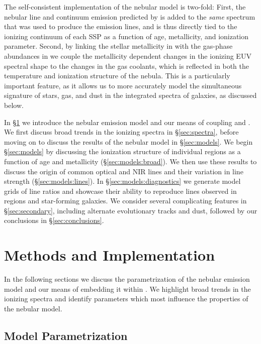 The self-consistent implementation of the nebular model is two-fold: First, the nebular line and continuum emission predicted by \Cloudy is added to the \emph{same} spectrum that was used to produce the emission lines, and is thus directly tied to the ionizing continuum of each SSP as a function of age, metallicity, and ionization parameter. Second, by linking the stellar metallicity in \FSPS with the gas-phase abundances in \Cloudy we couple the metallicity dependent changes in the ionizing EUV spectral shape to the changes in the gas coolants, which is reflected in both the temperature and ionization structure of the nebula. This is a particularly important feature, as it allows us to more accurately model the simultaneous signature of stars, gas, and dust in the integrated spectra of galaxies, as discussed below. 

In \S\ref{sec:methods} we introduce the nebular emission model and our means of coupling \FSPS and \Cloudy. We first discuss broad trends in the ionizing spectra in \S\ref{sec:spectra}, before moving on to discuss the results of the nebular model in \S\ref{sec:models}. We begin \S\ref{sec:models} by discussing the ionization structure of individual \hii regions as a function of age and metallicity (\S\ref{sec:models:broad}). We then use these results to discuss the origin of common optical and NIR lines and their variation in line strength (\S\ref{sec:models:lines}). In \S\ref{sec:models:diagnostics} we generate model grids of line ratios and showcase their ability to reproduce lines observed in \hii regions and star-forming galaxies. We consider several complicating features in \S\ref{sec:secondary}, including alternate evolutionary tracks and dust, followed by our conclusions in \S\ref{sec:conclusions}.

\section{Methods and Implementation}\label{sec:methods}

In the following sections we discuss the parametrization of the nebular emission model and our means of embedding it within \FSPS. We highlight broad trends in the ionizing spectra and identify parameters which most influence the properties of the nebular model.

\subsection{\Cloudy Model Parametrization}\label{sec:methods:cloudy}

